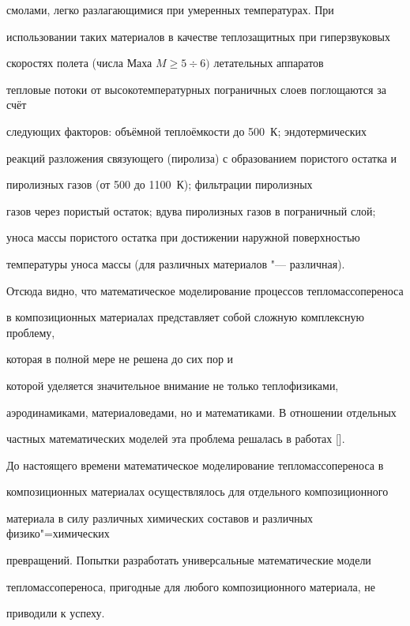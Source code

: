 смолами, легко разлагающимися при умеренных температурах. При

использовании таких материалов в качестве теплозащитных при гиперзвуковых

скоростях полета (числа Маха $M \ge 5 \div 6)$ летательных аппаратов 

тепловые потоки от высокотемпературных пограничных слоев поглощаются за счёт

следующих факторов: объёмной теплоёмкости до  500~К; эндотермических

реакций разложения связующего (пиролиза) с образованием пористого остатка и

пиролизных газов (от 500 до 1100~К); фильтрации пиролизных

газов через пористый остаток; вдува пиролизных газов в пограничный слой;

уноса массы пористого остатка при достижении наружной поверхностью

температуры уноса массы (для различных материалов "--- различная).



Отсюда видно, что математическое моделирование процессов тепломассопереноса

в композиционных материалах представляет собой сложную комплексную проблему,

которая в полной мере не решена до сих пор и

которой уделяется значительное внимание не только теплофизиками,

аэродинамиками, материаловедами, но и математиками. В отношении отдельных

частных математических моделей эта проблема решалась в работах [].



До настоящего времени математическое моделирование тепломассопереноса в

композиционных материалах осуществлялось для отдельного композиционного

материала в силу различных химических составов и различных физико"=химических

превращений. Попытки разработать универсальные математические модели

тепломассопереноса, пригодные для любого композиционного материала, не

приводили к успеху.



\smallskip



